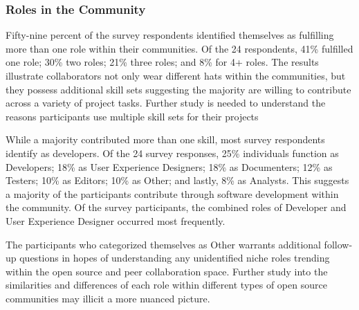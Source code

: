 \subsubsection{\bf Roles in the Community} Fifty-nine percent of the survey respondents identified themselves as fulfilling more than one 
role within their communities. Of the 24 respondents, 41\% fulfilled one role; 30\% two roles; 21\% three roles; and 8\% for 4+ roles. 
The results illustrate collaborators not only wear different hats within the communities, but they possess additional skill sets suggesting the majority 
are willing to contribute across a variety of project tasks. Further study is needed to understand the reasons participants use multiple skill sets for their projects  

While a majority contributed more than one skill, most survey respondents identify as developers. Of the 24 survey responses, 25\% individuals function as Developers; 
18\% as User Experience Designers; 18\% as Documenters; 12\% as Testers; 10\% as Editors; 10\% as Other; and lastly, 8\% as Analysts. This suggests a majority of the participants contribute through software development 
within the community. Of the survey participants, the combined roles of Developer and User Experience Designer occurred most frequently.  
 
The participants who categorized themselves as Other warrants additional follow-up questions in hopes of understanding any unidentified niche roles 
trending within the open source and peer collaboration space. Further study into the similarities and differences of each role within different types of open source 
communities may illicit a more nuanced picture.


